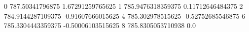 0 787.50341796875 1.67291259765625
1 785.9476318359375 0.11712646484375
2 784.9144287109375 -0.91607666015625
4 785.302978515625 -0.52752685546875
6 785.3304443359375 -0.50006103515625
8 785.8305053710938 0.0
